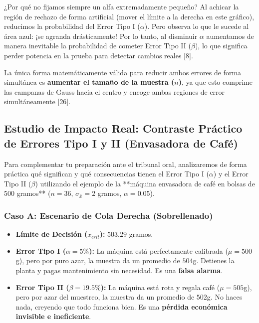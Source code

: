 \documentclass{article}
\begin{document}
\begin{didactico}{¿Por qué no fijamos siempre un alfa extremadamente pequeño?}
Al achicar la región de rechazo de forma artificial (mover el límite a la derecha en este gráfico), reducimos la probabilidad del Error Tipo I ($\alpha$). Pero observa lo que le sucede al área azul: ¡se agranda drásticamente!
Por lo tanto, al disminuir $\alpha$ aumentamos de manera inevitable la probabilidad de cometer Error Tipo II ($\beta$), lo que significa perder potencia en la prueba para detectar cambios reales [8].

La única forma matemáticamente válida para reducir ambos errores de forma simultánea es \textbf{aumentar el tamaño de la muestra ($n$)}, ya que esto comprime las campanas de Gauss hacia el centro y encoge ambas regiones de error simultáneamente [26].
\end{didactico}


\subsection{Estudio de Impacto Real: Contraste Práctico de Errores Tipo I y II (Envasadora de Café)}

Para complementar tu preparación ante el tribunal oral, analizaremos de forma práctica qué significan y qué consecuencias tienen el Error Tipo I ($\alpha$) y el Error Tipo II ($\beta$) utilizando el ejemplo de la **máquina envasadora de café en bolsas de 500 gramos** ($n = 36$, $\sigma_{\bar{x}} = 2$ gramos, $\alpha = 0.05$).

\subsubsection{Caso A: Escenario de Cola Derecha (Sobrellenado)}
\begin{itemize}
    \item \textbf{Límite de Decisión ($x_{crit}$):} $503.29$ gramos.
    \item \textbf{Error Tipo I ($\alpha = 5\%$):} La máquina está perfectamente calibrada ($\mu = 500$g), pero por puro azar, la muestra da un promedio de $504$g. Detienes la planta y pagas mantenimiento sin necesidad. Es una \textbf{falsa alarma}.
    \item \textbf{Error Tipo II ($\beta = 19.5\%$):} La máquina está rota y regala café ($\mu = 505$g), pero por azar del muestreo, la muestra da un promedio de $502$g. No haces nada, creyendo que todo funciona bien. Es una \textbf{pérdida económica invisible e ineficiente}.
\end{itemize}
\end{document}
